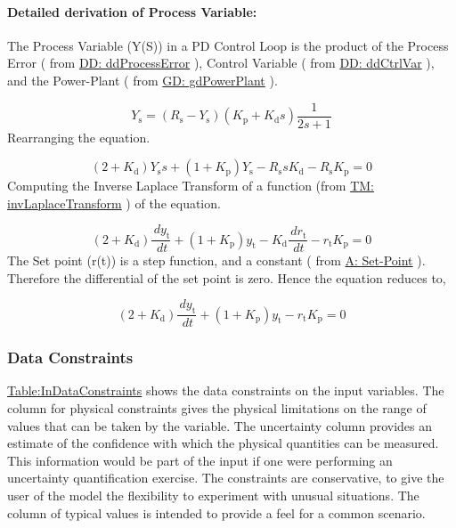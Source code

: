 \documentclass[12pt]{article}
\begin{document}
\paragraph{Detailed derivation of Process Variable:}
\label{IM:pdEquationIMDeriv}
The Process Variable (Y(S)) in a PD Control Loop is the product of the Process Error ( from  \hyperref[DD:ddProcessError]{DD: ddProcessError} ), Control Variable ( from \hyperref[DD:ddCtrlVar]{DD: ddCtrlVar}  ), and the Power-Plant ( from \hyperref[GD:gdPowerPlant]{GD: gdPowerPlant} ).

\begin{displaymath}
{Y_{\text{s}}}=\left({R_{\text{s}}}-{Y_{\text{s}}}\right) \left({K_{\text{p}}}+{K_{\text{d}}} s\right) \frac{1}{2 s+1}
\end{displaymath}
Rearranging the equation.

\begin{displaymath}
\left(2+{K_{\text{d}}}\right) {Y_{\text{s}}} s+\left(1+{K_{\text{p}}}\right) {Y_{\text{s}}}-{R_{\text{s}}} s {K_{\text{d}}}-{R_{\text{s}}} {K_{\text{p}}}=0
\end{displaymath}
Computing the Inverse Laplace Transform of a function (from  \hyperref[TM:invLaplaceTransform]{TM: invLaplaceTransform} ) of the equation.

\begin{displaymath}
\left(2+{K_{\text{d}}}\right) \frac{\,d{y_{\text{t}}}}{\,dt}+\left(1+{K_{\text{p}}}\right) {y_{\text{t}}}-{K_{\text{d}}} \frac{\,d{r_{\text{t}}}}{\,dt}-{r_{\text{t}}} {K_{\text{p}}}=0
\end{displaymath}
The Set point (r(t)) is a step function, and a constant  ( from  \hyperref[setPoint]{A: Set-Point} ). Therefore the  differential of the set point is zero. Hence the equation  reduces to,

\begin{displaymath}
\left(2+{K_{\text{d}}}\right) \frac{\,d{y_{\text{t}}}}{\,dt}+\left(1+{K_{\text{p}}}\right) {y_{\text{t}}}-{r_{\text{t}}} {K_{\text{p}}}=0
\end{displaymath}
\subsubsection{Data Constraints}
\label{Sec:DataConstraints}
\hyperref[Table:InDataConstraints]{Table:InDataConstraints} shows the data constraints on the input variables. The column for physical constraints gives the physical limitations on the range of values that can be taken by the variable. The uncertainty column provides an estimate of the confidence with which the physical quantities can be measured. This information would be part of the input if one were performing an uncertainty quantification exercise. The constraints are conservative, to give the user of the model the flexibility to experiment with unusual situations. The column of typical values is intended to provide a feel for a common scenario.
\end{document}

